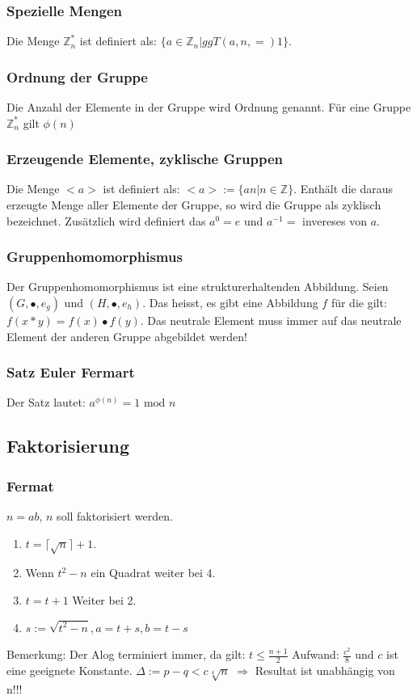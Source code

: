 \documentclass[landscape,twocolumn,a4paper]{article}
\newcommand{\ZN}{\mathbb{Z}} %
\newcommand{\T}[1]{\text{#1}} %
\newcommand{\Ra}{\Rightarrow}
\begin{document}
\subsubsection{Spezielle Mengen}
Die Menge $\ZN^*_n$ ist definiert als: $\{a \in \ZN_n|ggT(a,n,=)1\}$.
\subsubsection{Ordnung der Gruppe}
Die Anzahl der Elemente in der Gruppe wird Ordnung genannt. Für eine Gruppe $\ZN^*_n$ gilt $\phi(n)$
\subsubsection{Erzeugende Elemente, zyklische Gruppen}
Die Menge $<a>$ ist definiert als: $<a>:= \{an|n \in \ZN\}$. Enthält die daraus erzeugte Menge aller Elemente der Gruppe, so wird die Gruppe als zyklisch bezeichnet. Zusätzlich wird definiert das $a^0 = e$ und $a^{-1} =$ invereses von $a$.
\subsubsection{Gruppenhomomorphismus}
Der Gruppenhomomorphismus ist eine strukturerhaltenden Abbildung. Seien $(G,\bullet,e_g)$ und $(H,\bullet,e_h)$. Das heisst, es gibt eine Abbildung $f$ für die gilt: $f(x*y) = f(x) \bullet f(y)$. Das neutrale Element muss immer auf das neutrale Element der anderen Gruppe abgebildet werden!
\subsubsection{Satz Euler Fermart}
Der Satz lautet: $a^{\phi(n)} = 1\T{ mod }n$
\subsection{Faktorisierung}
\subsubsection{Fermat}
$n=ab$, $n$ soll faktorisiert werden. 
\begin{enumerate}
\item $t = \lceil \sqrt n \rceil + 1$. 
\item Wenn $t^2 - n$ ein Quadrat weiter bei 4.
\item $t = t + 1$ Weiter bei 2.
\item $s := \sqrt{t^2 -n}, a = t + s, b = t - s$
\end{enumerate}
Bemerkung: Der Alog terminiert immer, da gilt: $t \le \frac{n+1}{2}$
Aufwand: $\frac{c^2}{8}$ und $c$ ist eine geeignete Konstante. $\Delta := p-q < c \sqrt[4]{n}$ {\color{red} $\Ra$ Resultat ist unabhängig von n!!!} 
\end{document}
